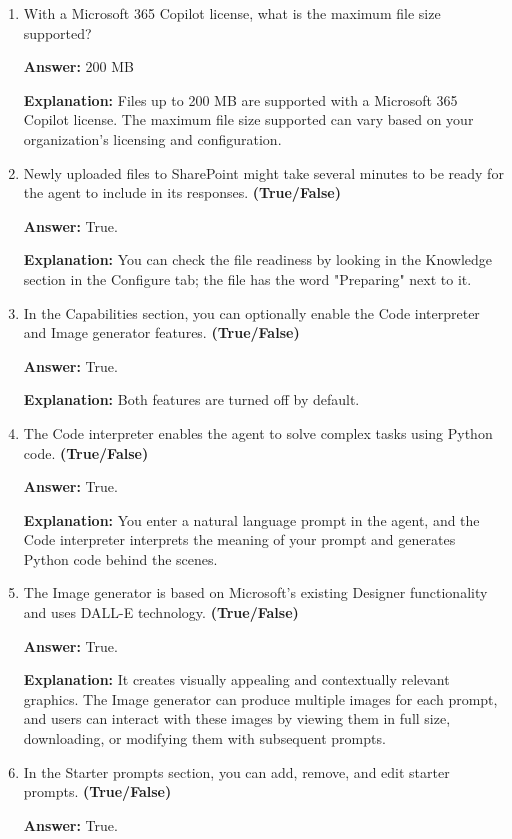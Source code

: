 \documentclass[10pt]{article}
\begin{document}
\begin{enumerate}[leftmargin=*]
\item With a Microsoft 365 Copilot license, what is the maximum file size supported?

\textbf{Answer:} 200 MB

\textbf{Explanation:} Files up to 200 MB are supported with a Microsoft 365 Copilot license. The maximum file size supported can vary based on your organization's licensing and configuration.

\item Newly uploaded files to SharePoint might take several minutes to be ready for the agent to include in its responses. \textbf{(True/False)}

\textbf{Answer:} True.

\textbf{Explanation:} You can check the file readiness by looking in the Knowledge section in the Configure tab; the file has the word "Preparing" next to it.

\item In the Capabilities section, you can optionally enable the Code interpreter and Image generator features. \textbf{(True/False)}

\textbf{Answer:} True.

\textbf{Explanation:} Both features are turned off by default.

\item The Code interpreter enables the agent to solve complex tasks using Python code. \textbf{(True/False)}

\textbf{Answer:} True.

\textbf{Explanation:} You enter a natural language prompt in the agent, and the Code interpreter interprets the meaning of your prompt and generates Python code behind the scenes.

\item The Image generator is based on Microsoft’s existing Designer functionality and uses DALL-E technology. \textbf{(True/False)}

\textbf{Answer:} True.

\textbf{Explanation:} It creates visually appealing and contextually relevant graphics. The Image generator can produce multiple images for each prompt, and users can interact with these images by viewing them in full size, downloading, or modifying them with subsequent prompts.

\item In the Starter prompts section, you can add, remove, and edit starter prompts. \textbf{(True/False)}

\textbf{Answer:} True.


\end{enumerate}
\end{document}
